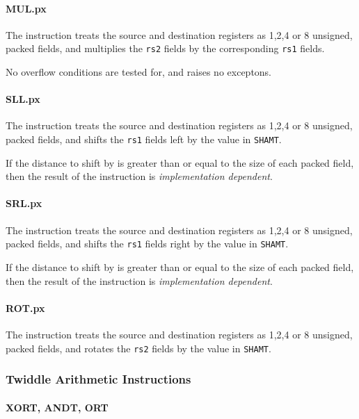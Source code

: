 \paragraph{MUL.px}

The instruction  treats the source and destination registers as
1,2,4 or 8 unsigned, packed fields, and multiplies the {\tt rs2} fields by
the corresponding {\tt rs1} fields.

No overflow conditions are tested for, and  raises no exceptons.

\paragraph{SLL.px}

The instruction  treats the source and destination registers as
1,2,4 or 8 unsigned, packed fields, and shifts the {\tt rs1} fields left
by the value in {\tt SHAMT}.

If the distance to shift by is greater than or equal to the size of each
packed field, then the result of the  instruction is
{\em implementation dependent}.

\paragraph{SRL.px}

The instruction  treats the source and destination registers as
1,2,4 or 8 unsigned, packed fields, and shifts the {\tt rs1} fields right
by the value in {\tt SHAMT}.

If the distance to shift by is greater than or equal to the size of each
packed field, then the result of the  instruction is
{\em implementation dependent}.

\paragraph{ROT.px}

The instruction  treats the source and destination registers as
1,2,4 or 8 unsigned, packed fields, and rotates the {\tt rs2} fields by
the value in {\tt SHAMT}.

\subsubsection{Twiddle Arithmetic Instructions}

\paragraph{XORT, ANDT, ORT}

